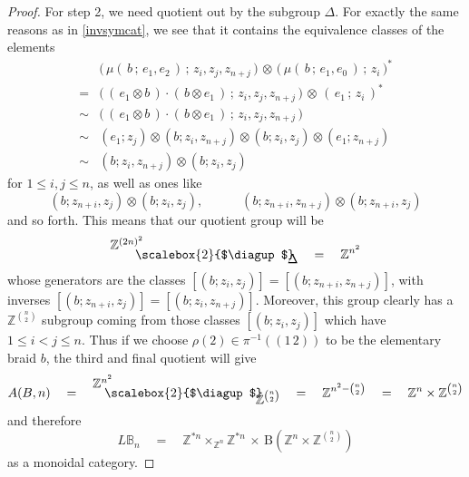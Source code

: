 \documentclass{amsbook} %
\newcommand{\bigquotient}[2]{ \raisebox{0.75\height}{$#1$} \mkern-12mu\scalebox{2}{$\diagup$}\mkern-10mu \raisebox{-0.5\height}{$#2$} }
\numberwithin{section}{chapter}
\begin{document}
\begin{proof}
For step 2, we need quotient out by the subgroup $\Delta$. For exactly the same reasons as in \cref{invsymcat}, we see that it contains the equivalence classes of the elements
\[ \begin{array}{rl}
			& \big( \, \mu( \, b \, ; \, e_1, e_2 \, ) \, ; \, z_i , z_j, z_{n+j} \, \big) \, \otimes \, \big( \,  \mu( \, b \, ; \, e_1, e_0 \, ) \, ; \, z_i \, \big)^* \\
			= & \big( \, ( \, e_1 \otimes b \, ) \cdot ( \, b \otimes e_1 \,) \, ; \, z_i , z_j, z_{n+j} \, \big) \, \otimes \, ( \, e_1 \, ; \, z_i \, )^* \\
			\sim & \big( \, ( \, e_1 \otimes b \, ) \cdot ( \, b \otimes e_1 \,) \, ; \, z_i , z_j, z_{n+j} \, \big) \\
			\sim &  (e_1 ; z_j) \otimes ( b ;  z_i, z_{n+j}) \otimes ( b ;  z_i , z_{j} ) \otimes (e_1 ;z_{n+j}) \\
			\sim & (b ;  z_i, z_{n+j}) \otimes (b;  z_i , z_j)
		\end{array}
\]
for $1 \le i,j \le n$, as well as ones like
\[ (b ;  z_{n+i}, z_j) \otimes (b;  z_i , z_j), \quad \quad \quad (b; z_{n+i}, z_{n+j}) \otimes (b;  z_{n+i} , z_j) \]
and so forth. This means that our quotient group will be
\[ \bigquotient{\mathbb{Z}^{(2n)^2}}{\Delta} \quad = \quad \mathbb{Z}^{n^2} \]
whose generators are the classes $[(b; z_i, z_j)] = [(b; z_{n+i}, z_{n+j})]$, with inverses $[(b; z_{n+i}, z_j)] = [(b; z_i, z_{n+j})]$. Moreover, this group clearly has a $\mathbb{Z}^{{n}\choose{2}}$ subgroup coming from those classes $[(b; z_i, z_j)]$ which have $1 \le i < j \le n$. Thus if we choose $\rho(2) \in \pi^{-1}((1 \, 2))$ to be the elementary braid $b$, the third and final quotient will give
\[ A(B,n) \quad = \quad \bigquotient{\mathbb{Z}^{n^2}}{\mathbb{Z}^{{n}\choose{2}}} \quad = \quad \mathbb{Z}^{n^2 - {{n}\choose{2}}} \quad = \quad \mathbb{Z}^{n} \times \mathbb{Z}^{{n}\choose{2}} \]
and therefore
\[ L\mathbb{B}_n \quad = \quad \mathbb{Z}^{\ast n} \times_{\mathbb{Z}^n} \mathbb{Z}^{\ast n}  \, \times \, \mathrm{B}(\mathbb{Z}^{n} \times \mathbb{Z}^{{n}\choose{2}}) \]
as a monoidal category.
\end{proof} 
\end{document}
